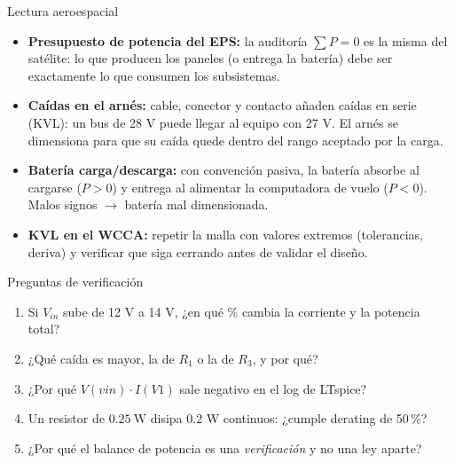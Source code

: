 \documentclass[aspectratio=169]{beamer}
\begin{document}
\begin{frame}{Lectura aeroespacial}
  \begin{itemize}
    \item \textbf{Presupuesto de potencia del EPS:} la auditoría $\sum P = 0$ es la
      misma del satélite: lo que producen los paneles (o entrega la batería) debe
      ser exactamente lo que consumen los subsistemas.
    \item \textbf{Caídas en el arnés:} cable, conector y contacto añaden caídas en
      serie (KVL): un bus de 28 V puede llegar al equipo con 27 V. El arnés se
      dimensiona para que su caída quede dentro del rango aceptado por la carga.
    \item \textbf{Batería carga/descarga:} con convención pasiva, la batería absorbe
      al cargarse ($P>0$) y entrega al alimentar la computadora de vuelo ($P<0$).
      Malos signos $\rightarrow$ batería mal dimensionada.
    \item \textbf{KVL en el WCCA:} repetir la malla con valores extremos
      (tolerancias, deriva) y verificar que siga cerrando antes de validar el diseño.
  \end{itemize}
\end{frame}

\begin{frame}{Preguntas de verificación}
  \begin{enumerate}
    \item Si $V_{in}$ sube de 12 V a 14 V, ¿en qué \% cambia la corriente y la potencia total?
    \item ¿Qué caída es mayor, la de $R_1$ o la de $R_3$, y por qué?
    \item ¿Por qué $V(vin)\cdot I(V1)$ sale negativo en el log de LTspice?
    \item Un resistor de $\SI{0.25}{\watt}$ disipa 0.2 W continuos: ¿cumple derating de 50\,\%?
    \item ¿Por qué el balance de potencia es una \emph{verificación} y no una ley aparte?
  \end{enumerate}
\end{frame}
\end{document}
